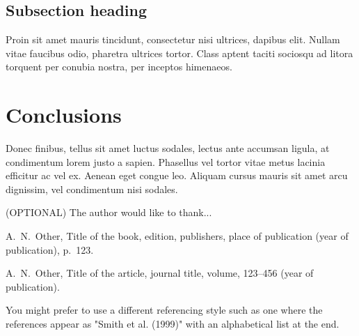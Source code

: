 \documentclass[12pt, onecolumn]{revtex4}    %
\begin{document}
\subsection{Subsection heading} 

Proin sit amet mauris tincidunt, consectetur nisi ultrices, dapibus elit. Nullam vitae faucibus odio, pharetra ultrices tortor. Class aptent taciti sociosqu ad litora torquent per conubia nostra, per inceptos himenaeos. 

\section{Conclusions}
 
Donec finibus, tellus sit amet luctus sodales, lectus ante accumsan ligula, at condimentum lorem justo a sapien. Phasellus vel tortor vitae metus lacinia efficitur ac vel ex. Aenean eget congue leo. Aliquam cursus mauris sit amet arcu dignissim, vel condimentum nisi sodales. 

\begin{acknowledgments}
(OPTIONAL) The author would like to thank...
\end{acknowledgments}

\begin{thebibliography}{}

 A.~N.~Other, Title of the book, edition, publishers, place of publication (year of publication), p.~123.   %

 A.~N.~Other, Title of the article, journal title, volume, 123--456 (year of publication).   %

 You might prefer to use a different referencing style such as one where the references appear as "Smith et al. (1999)" with an alphabetical list at the end.

\end{thebibliography} 
\end{document}
